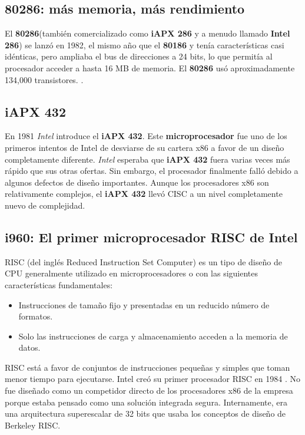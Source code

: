 \subsection{\textbf{80286}: más memoria, más rendimiento}
El \textbf{80286}(también comercializado como \textbf{iAPX 286} y a menudo llamado \textbf{Intel 286}) se lanzó en 1982, el mismo año que el \textbf{80186} y tenía
características casi idénticas, pero ampliaba el bus de direcciones a 24 bits, lo que permitía al procesador acceder a hasta 16 MB de memoria.
El \textbf{80286} usó aproximadamente 134,000 transistores. .

\subsection{iAPX 432}
En 1981 \emph{Intel}  introduce el \textbf{iAPX 432}. Este \textbf{microprocesador} fue uno de los primeros intentos de Intel de desviarse de su cartera x86 a favor de un 
diseño completamente diferente. \emph{Intel} esperaba que \textbf{iAPX 432} fuera varias veces más rápido que sus otras ofertas. Sin embargo, el procesador 
finalmente falló debido a algunos defectos de diseño importantes. Aunque los procesadores x86 son relativamente complejos, el \textbf{iAPX 432} 
llevó CISC a un nivel completamente nuevo de complejidad.

\subsection{i960: El primer microprocesador RISC de Intel}
RISC (del inglés Reduced Instruction Set Computer) es un tipo de diseño de CPU generalmente utilizado en microprocesadores o 
con las siguientes características fundamentales:
\begin{itemize}
	\item Instrucciones de tamaño fijo y presentadas en un reducido número de formatos.
	\item Solo las instrucciones de carga y almacenamiento acceden a la memoria de datos.
\end{itemize}
RISC está a favor de conjuntos de instrucciones pequeñas y simples que toman menor tiempo para ejecutarse.
Intel creó su primer procesador RISC en 1984 . No fue diseñado como un competidor directo de los procesadores 
x86 de la empresa porque estaba pensado como una solución integrada segura. Internamente, era una arquitectura superescalar de 32 bits que 
usaba los conceptos de diseño de Berkeley RISC.

